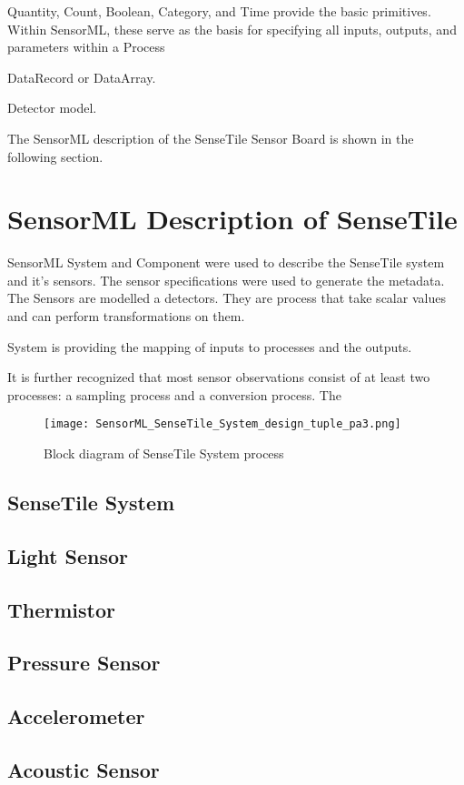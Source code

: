 \documentclass[]{final_report}
\begin{document}
Quantity, Count, Boolean, Category, and Time provide the basic primitives. Within SensorML, these serve as the basis for specifying all inputs, outputs, and parameters within a Process

DataRecord or DataArray.

Detector model.

The SensorML description of the SenseTile Sensor Board is shown in the following section.

\section{SensorML Description of SenseTile}

SensorML System and Component were used to describe the SenseTile system and it's sensors. The sensor specifications were used to generate the metadata.
The Sensors are modelled a detectors. They are process that take scalar values
and can perform transformations on them.

System is providing the mapping of inputs to processes and the outputs.

It is further recognized that most sensor observations consist of at least two processes: a sampling process and a conversion process.
The 
 \begin{figure}
\texttt{[image: SensorML\_SenseTile\_System\_design\_tuple\_pa3.png]}
\caption{Block diagram of SenseTile System process}\label{fig:SensorML_SenseTile_design.png}
\end{figure}

\subsection{SenseTile System}
\subsection{Light Sensor}
\subsection{Thermistor}
\subsection{Pressure Sensor}
\subsection{Accelerometer}
\subsection{Acoustic Sensor}
\end{document}
